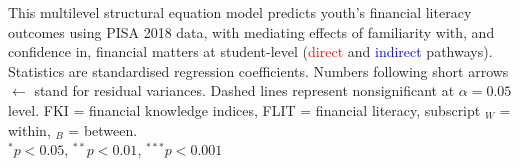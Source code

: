 {
}{This multilevel structural equation model predicts youth's financial literacy outcomes using PISA 2018 data, with mediating effects of familiarity with, and confidence in, financial matters at student-level (\textcolor{red}{direct} and \textcolor{blue}{indirect} pathways). Statistics are standardised regression coefficients. Numbers following short arrows $\leftarrow$ stand for residual variances. Dashed lines represent nonsignificant at $\alpha=0.05$ level. FKI = financial knowledge indices, FLIT = financial literacy, subscript $_W$ = within, $_B$ = between.\\$^{*}p<0.05$, $^{**}p<0.01$, $^{***}p<0.001$}
